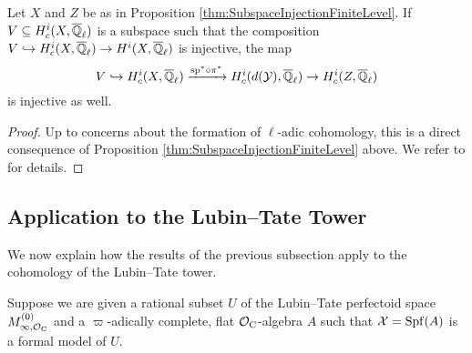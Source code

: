 \documentclass[../main.tex]{subfiles}
\begin{document}
\begin{thm}\label{thm:MiedaInjectivityAtFiniteLevel}
  Let $X$ and $Z$ be as in Proposition \ref{thm:SubspaceInjectionFiniteLevel}.
  If $V \subseteq H^i_c(X, {\overline {\mathbb{Q}}_\ell})$ is a subspace such that the 
  composition $V \hookrightarrow H^i_c(X, {\overline {\mathbb{Q}}_\ell}) \to H^i(X, {\overline {\mathbb{Q}}_\ell})$ is injective,
  the map 
  \begin{equation*}
    V \hookrightarrow H^i_c(X, {\overline {\mathbb{Q}}_\ell}) \xrightarrow{\mathrm{sp}^* \circ \pi^*}
    H^i_c(d(\mathcal{Y}), {\overline {\mathbb{Q}}_\ell}) \to H^i_c(Z, {\overline {\mathbb{Q}}_\ell})
  \end{equation*}
  is injective as well.
\begin{proof}
  Up to concerns about the formation of $\ell$-adic cohomology, this is a
  direct consequence of Proposition \ref{thm:SubspaceInjectionFiniteLevel}
  above. We refer to \cite[Theorem 2.8]{mieda2016geometric} for details.
\end{proof}
\end{thm}





\subsection{Application to the Lubin--Tate Tower} %
\label{sub:Application to the Lubin--Tate Tower}

We now explain how the results of the previous subsection apply to the 
cohomology of the Lubin--Tate tower.

Suppose we are given a rational subset $U$ of the Lubin--Tate perfectoid space
$M_{\infty, \mathcal{O}_{\mathrm{C}}}^{(0)}$ and a $\varpi$-adically complete, flat $\mathcal{O}_{\mathrm{C}}$-algebra
$A$ such that $\mathcal{X} = \operatorname{Spf}(A)$ is a formal model of $U$. 
\end{document}
